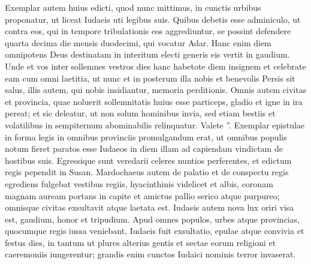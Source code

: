 \begin{biblechapter}
\begin{biblechapter}
\begin{biblechapter}
\begin{biblechapter}
\begin{biblechapter}
\begin{biblechapter}
\begin{biblechapter}
\begin{biblechapter}
 \versex Exemplar autem huius edicti, quod nunc mittimus, in cunctis urbibus proponatur, ut liceat Iudaeis uti legibus suis. 
\versey Quibus debetis esse adminiculo, ut contra eos, qui in tempore tribulationis eos aggrediuntur, se possint defendere quarta decima die mensis duodecimi, qui vocatur Adar. 
\versez Hanc enim diem omnipotens Deus destinatam in interitum electi generis eis vertit in gaudium. 
\verseaa Unde et vos inter sollemnes vestros dies hanc habetote diem insignem et celebrate eam cum omni laetitia, 
\versebb ut nunc et in posterum illa nobis et benevolis Persis sit salus, illis autem, qui nobis insidiantur, memoria perditionis.
 \versecc Omnis autem civitas et provincia, quae noluerit sollemnitatis huius esse particeps, gladio et igne in ira pereat; et sic deleatur, ut non solum hominibus invia, sed etiam bestiis et volatilibus in sempiternum abominabilis relinquatur. Valete ”.
 \verse Exemplar epistulae in forma legis in omnibus provinciis promulgandum erat, ut omnibus populis notum fieret paratos esse Iudaeos in diem illam ad capiendam vindictam de hostibus suis. 
\verse Egressique sunt veredarii celeres nuntios perferentes, et edictum regis pependit in Susan.
 \verse Mardochaeus autem de palatio et de conspectu regis egrediens fulgebat vestibus regiis, hyacinthinis videlicet et albis, coronam magnam auream portans in capite et amictus pallio serico atque purpureo; omnisque civitas exsultavit atque laetata est. 
\verse Iudaeis autem nova lux oriri visa est, gaudium, honor et tripudium. 
\verse Apud omnes populos, urbes atque provincias, quocumque regis iussa veniebant, Iudaeis fuit exsultatio, epulae atque convivia et festus dies, in tantum ut plures alterius gentis et sectae eorum religioni et caeremoniis iungerentur; grandis enim cunctos Iudaici nominis terror invaserat.
 

\end{biblechapter}
\end{biblechapter}
\end{biblechapter}
\end{biblechapter}
\end{biblechapter}
\end{biblechapter}
\end{biblechapter}
\end{biblechapter}
